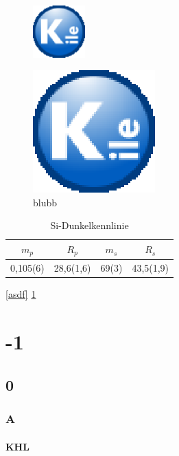 \begin{figure}[htb]
	\includegraphics[width=2cm,
bb=0 0 120 101]{teppich.eps}
\label{picture---}
\end{figure}

\begin{figure}[b!]
\centering
{}
\includegraphics{teppich.eps}
\caption{blubb}
\label{fig:stuff}
\end{figure}

\begin{table}[h]
\centering
\begin{tabular}{cccc}
$m_p$  & $R_p$  & $m_s$ & $R_s$ \\ \toprule
0,105(6)&28,6(1,6)&69(3)&43,5(1,9) \\ \bottomrule
\end{tabular}
\caption{Si-Dunkelkennlinie}
\label{tab:si-ivt-dunkel}
\vspace{1cm}
\end{table}

\label{asdf}
\ref{asdf}
\pageref{asdf}
\ref{picture---}

\part{-1}
\chapter{0}
\section{A}
\subsection{KHL}
